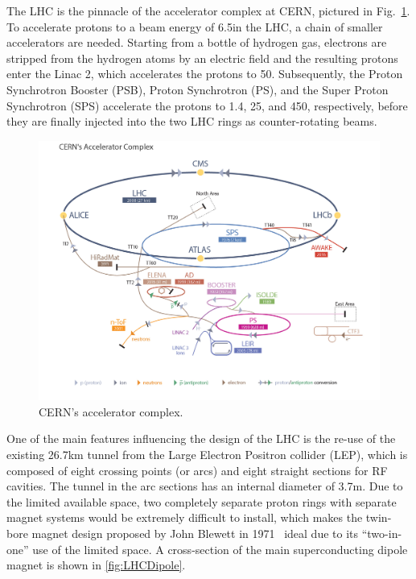 The LHC is the pinnacle of the accelerator
complex at CERN, pictured in Fig.~\ref{fig:LHCComplex}.  To accelerate
protons to a beam energy of 6.5\TeV in the LHC, a chain of smaller
accelerators are needed. Starting from a bottle of hydrogen gas,
electrons are stripped from the hydrogen atoms by an electric field
and the resulting protons enter the Linac 2, which accelerates the
protons to 50\MeV. Subsequently, the Proton Synchrotron Booster (PSB), Proton Synchrotron (PS), and the
Super Proton Synchrotron (SPS) accelerate the protons to 1.4\GeV, 25\GeV, and 450\GeV, respectively, before they are finally injected
into the two LHC rings as counter-rotating beams.

\begin{figure}\centering
\includegraphics[width=.9\textwidth]{figs/cms/LHC_default.jpg}
\caption{CERN's accelerator complex.\label{fig:LHCComplex}}
\end{figure}

One of the main features influencing the design of the LHC is the re-use of the
existing 26.7\unit{km} tunnel from the Large Electron Positron collider (LEP), which is
composed of eight crossing points (or arcs) and eight straight sections for
RF cavities. The tunnel in the arc sections has an internal diameter of 3.7\unit{m}. Due to the limited available space, two completely separate
proton rings with separate magnet systems would be extremely difficult to install, which makes the twin-bore magnet design proposed by John
Blewett in 1971~\cite{Blewett:1068131} ideal due to its
``two-in-one'' use of the limited space. A cross-section of the main superconducting
dipole magnet is shown in \ref{fig:LHCDipole}.

